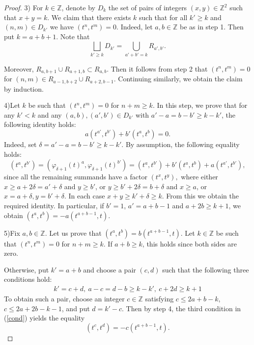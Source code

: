 \documentclass[11pt,a4paper]{article}
\theoremstyle{plain}
\newcommand{\Z}{\mathbb{Z}}
\begin{document}
\begin{proof}
		
		3) For $k \in \Z$, denote by $D_{k}$ the set of pairs of integers
		$(x,y)\in \Z^2$ such that $x + y = k$.
		We claim that there exists $k$ such that for all $k' \geq k$
		and $(n,m) \in D_{k'}$ we have $(t^n, t^m) = 0$.
		Indeed, let $a,b \in \Z$ be as in step 1.
		Then put $k = a + b + 1$.
		Note that
		$$\bigsqcup_{k' \geq k} D_{k'} = \bigcup\limits_{a'+b' = k} R_{a',b'}.$$
		
		Moreover, $R_{a,b+1} \cup R_{a+1,b} \subset R_{a,b}.$
		Then it follows from step 2 that $(t^n, t^m) = 0$
		for $(n,m) \in R_{a-1, b+2} \cup R_{a+2,b-1}$. 
		Continuing similarly, we obtain the claim by induction.

		
		
		4)Let $k$ be such that $(t^n, t^m) = 0$ for $n+m \geq k$.
		In this step, we prove that for any $k' < k$ and any
		$(a,b), (a',b') \in D_{k'}$ with
		$a' - a = b - b' \geq k - k'$, the following identity holds:
		\begin{equation}\label{maineq}
			a(t^{a'}, t^{b'}) + b' (t^{a}, t^{b}) = 0.
		\end{equation}
		Indeed, set $\delta = a' - a = b - b' \geq k - k'.$
		By assumption, the following equality holds:
		$$(t^a, t^{b'})  = (\varphi_{\delta + 1}(t)^a, \varphi_{\delta + 1}(t)^{b'}) = (t^a, t^{b'}) + b'(t^a, t^{b}) + a(t^{a'}, t^{b'}),$$
		since all the remaining summands have a factor
		$(t^{x}, t^{y}),$ where either $x \geq a + 2\delta = a' + \delta$
		and $y\geq b'$, or $y \geq b' + 2\delta = b + \delta$
		and $x \geq a$, or $x = a + \delta, y = b'+\delta$. In each case $x + y \geq k' + \delta \geq k$.
		From this we obtain the required identity.
		In particular, if $b' = 1$, $a' = a + b - 1$
		and $a + 2b \geq k + 1$, we obtain
		$(t^a, t^b) = -a(t^{a + b - 1}, t)$.
		
		
		
		5)Fix $a, b \in \Z$. Let us prove that
		$(t^a, t^b) = b (t^{a+b-1}, t)$. Let $k \in \Z$ be such that $(t^n, t^m) = 0$ for $n + m \geq k$.
		If $a + b \geq k$, this holds since both sides are zero.
		
		Otherwise, put $k' = a + b$ and choose a pair $(c,d)$ such that
		the following three conditions hold:
		\begin{align}\label{cond}
		k' = c + d, \  a-c = d-b \geq k-k', \ c + 2d \geq k + 1
		\end{align}
		To obtain such a pair, choose an integer
		$c \in \Z$ satisfying
		$c \leq 2a + b - k$, $c \leq 2a + 2b - k - 1$,
		and put $d = k' - c$.
		Then by step 4, the third condition in (\ref{cond}) yields the equality
		$$(t^{c}, t^{d}) = -c(t^{a + b - 1}, t).$$
		

\end{proof}
\end{document}
